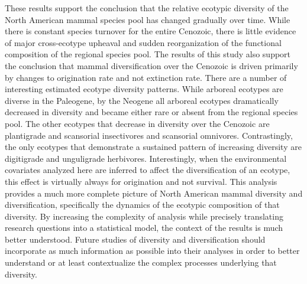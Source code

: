 \documentclass[12pt,letterpaper]{article}
\begin{document}
These results support the conclusion that the relative ecotypic diversity of the North American mammal species pool has changed gradually over time. While there is constant species turnover for the entire Cenozoic, there is little evidence of major cross-ecotype upheaval and sudden reorganization of the functional composition of the regional species pool. The results of this study also support the conclusion that mammal diversification over the Cenozoic is driven primarily by changes to origination rate and not extinction rate. There are a number of interesting estimated ecotype diversity patterns. While arboreal ecotypes are diverse in the Paleogene, by the Neogene all arboreal ecotypes dramatically decreased in diversity and became either rare or absent from the regional species pool. The other ecotypes that decrease in diversity over the Cenozoic are plantigrade and scansorial insectivores and scansorial omnivores. Contrastingly, the only ecotypes that demonstrate a sustained pattern of increasing diversity are digitigrade and unguligrade herbivores. Interestingly, when the environmental covariates analyzed here are inferred to affect the diversification of an ecotype, this effect is virtually always for origination and not survival. This analysis provides a much more complete picture of North American mammal diversity and diversification, specifically the dynamics of the ecotypic composition of that diversity. By increasing the complexity of analysis while precisely translating research questions into a statistical model, the context of the results is much better understood. Future studies of diversity and diversification should incorporate as much information as possible into their analyses in order to better understand or at least contextualize the complex processes underlying that diversity.
\end{document}
